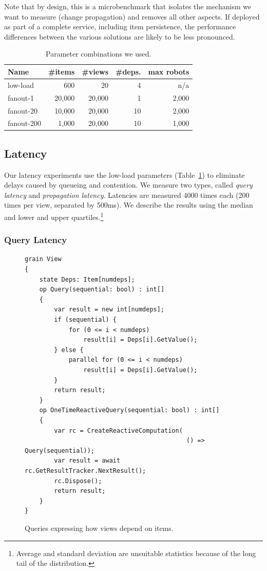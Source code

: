 Note that by design, this is a microbenchmark that isolates the mechanism we want to measure (change propagation) and removes all other aspects. If deployed as part of a complete service, including item persistence, the performance differences between the various solutions are likely to be less pronounced.
 
\begin{table}
\begin{tabularx}{.99\columnwidth}{@{}Xrrrr@{}} \toprule
Name		& \#items 	& \#views & \#deps. & max robots\\ \midrule
low-load	&  600        	& 20       & 4 & n/a \\
fanout-1	& 20,000	& 20,000 & 1& 2,000 \\
fanout-20	& 10,000	& 20,000 & 10 & 2,000\\
fanout-200 & 1,000	& 20,000 & 10& 1,000\\  
\end{tabularx}
\caption{Parameter combinations we used.}\label{tab:param}
\end{table}


\subsection{Latency}\label{sec:latency}

Our latency experiments use the low-load parameters (Table~\ref{tab:param}) to eliminate delays caused by queueing and contention. We measure two types, called \emph{query latency} and \emph{propagation latency}. Latencies are measured 4000 times each (200 times per view, separated by 500ms). We describe the results using the median and lower and upper quartiles.\footnote{Average and standard deviation are unsuitable statistics because of the long tail of the distribution.}

\subsubsection{Query Latency}

\begin{figure}
\begin{lstlisting}
grain View
{
	state Deps: Item[numdeps]; 
	op Query(sequential: bool) : int[]
	{	
		var result = new int[numdeps];
		if (sequential) {
			for (0 <= i < numdeps)
				result[i] = Deps[i].GetValue();
		} else {
			parallel for (0 <= i < numdeps)
				result[i] = Deps[i].GetValue();
		}
		return result;
	}
	op OneTimeReactiveQuery(sequential: bool) : int[]
	{
	 	var rc = CreateReactiveComputation(
	 										() => Query(sequential));
		var result = await rc.GetResultTracker.NextResult();
		rc.Dispose();
		return result;
	}
}
\end{lstlisting}
\caption{Queries expressing how views depend on items.}\label{fig:queries}
\end{figure}

